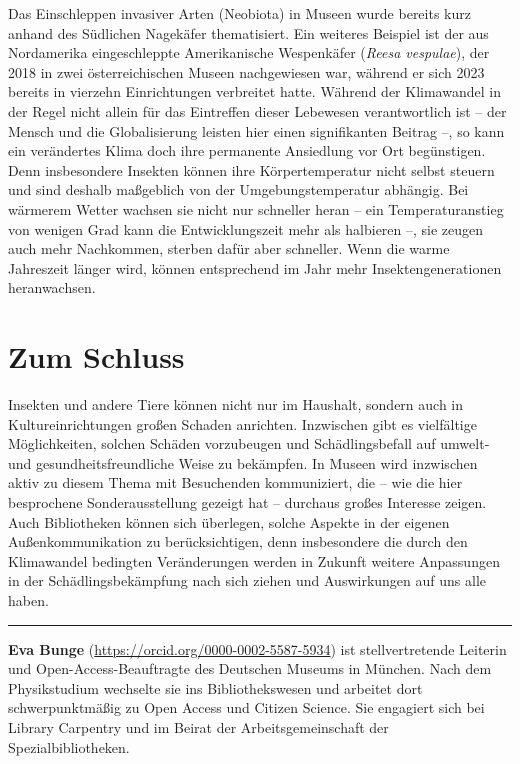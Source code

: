 \documentclass[a4paper,
fontsize=11pt,
oneside,
numbers=noperiodatend,
parskip=half-,
bibliography=totoc,
final
]{scrartcl}
\begin{document}
Das Einschleppen invasiver Arten (Neobiota) in Museen wurde bereits kurz
anhand des Südlichen Nagekäfer thematisiert. Ein weiteres Beispiel ist
der aus Nordamerika eingeschleppte Amerikanische Wespenkäfer
(\emph{Reesa vespulae}), der 2018 in zwei österreichischen Museen
nachgewiesen war, während er sich 2023 bereits in vierzehn Einrichtungen
verbreitet hatte. Während der Klimawandel in der Regel nicht allein für
das Eintreffen dieser Lebewesen verantwortlich ist -- der Mensch und die
Globalisierung leisten hier einen signifikanten Beitrag --, so kann ein
verändertes Klima doch ihre permanente Ansiedlung vor Ort begünstigen.
Denn insbesondere Insekten können ihre Körpertemperatur nicht selbst
steuern und sind deshalb maßgeblich von der Umgebungstemperatur
abhängig. Bei wärmerem Wetter wachsen sie nicht nur schneller heran --
ein Temperaturanstieg von wenigen Grad kann die Entwicklungszeit mehr
als halbieren --, sie zeugen auch mehr Nachkommen, sterben dafür aber
schneller. Wenn die warme Jahreszeit länger wird, können entsprechend im
Jahr mehr Insektengenerationen heranwachsen.

\section{Zum Schluss}\label{zum-schluss}

Insekten und andere Tiere können nicht nur im Haushalt, sondern auch in
Kultureinrichtungen großen Schaden anrichten. Inzwischen gibt es
vielfältige Möglichkeiten, solchen Schäden vorzubeugen und
Schädlingsbefall auf umwelt- und gesundheitsfreundliche Weise zu
bekämpfen. In Museen wird inzwischen aktiv zu diesem Thema mit
Besuchenden kommuniziert, die -- wie die hier besprochene
Sonderausstellung gezeigt hat -- durchaus großes Interesse zeigen. Auch
Bibliotheken können sich überlegen, solche Aspekte in der eigenen
Außenkommunikation zu berücksichtigen, denn insbesondere die durch den
Klimawandel bedingten Veränderungen werden in Zukunft weitere
Anpassungen in der Schädlingsbekämpfung nach sich ziehen und
Auswirkungen auf uns alle haben.

\begin{center}\rule{0.5\linewidth}{0.5pt}\end{center}

\textbf{Eva Bunge} (\url{https://orcid.org/0000-0002-5587-5934}) ist stellvertretende Leiterin und
Open-Access-Beauftragte des Deutschen Museums in München. Nach dem
Physikstudium wechselte sie ins Bibliothekswesen und arbeitet dort
schwerpunktmäßig zu Open Access und Citizen Science. Sie engagiert sich
bei Library Carpentry und im Beirat der Arbeitsgemeinschaft der
Spezialbibliotheken.
\end{document}
